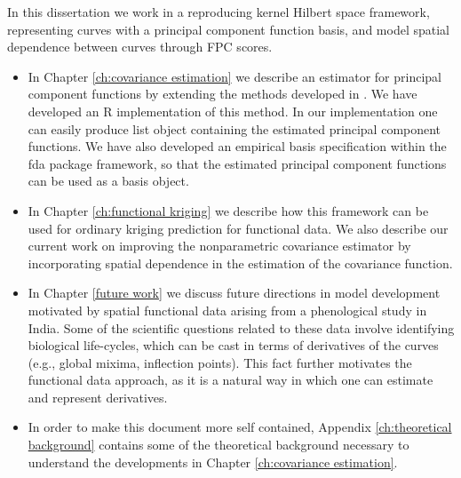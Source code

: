 In this dissertation we work in a reproducing kernel Hilbert space framework, representing curves with a principal component function basis, and model spatial dependence between curves through FPC scores.  
\begin{itemize}
\item In Chapter \ref{ch:covariance estimation} we describe an estimator for principal component functions by extending the methods developed in \cite{Cai:2010vr}. We have developed an R implementation of this method. In our implementation one can easily produce list object containing the estimated principal component functions. We have also developed an empirical basis specification  within the fda package framework, so that the estimated principal component functions can be used as a basis object.  %
\item In Chapter \ref{ch:functional kriging} we describe how this framework can be used for ordinary kriging prediction for functional data. We also describe our current work on improving the nonparametric covariance estimator by incorporating spatial dependence in the estimation of the covariance function. 
\item  In Chapter \ref{future work} we discuss future directions in model development motivated by spatial functional data arising from a phenological study in India. Some of the scientific questions related to these data involve identifying biological life-cycles, which can be cast in terms of derivatives of the curves (e.g., global mixima, inflection points). This fact further motivates the functional data approach, as it is a natural way in which one can estimate and represent derivatives. 
\item In order to make this document more self contained, Appendix \ref{ch:theoretical background} contains some of the theoretical background necessary to understand the developments in Chapter \ref{ch:covariance estimation}. 
\end{itemize}

